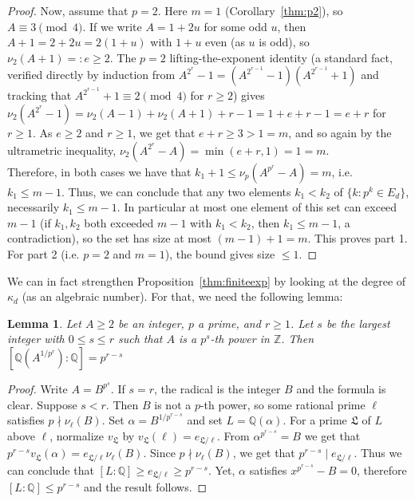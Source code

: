\documentclass{article}
\theoremstyle{plain}
\newtheorem{lemma}[theorem]{Lemma}
\theoremstyle{definition}
\theoremstyle{remark}
\newcommand{\Z}{\mathbb{Z}}
\newcommand{\Q}{\mathbb{Q}}
\begin{document}
\begin{proof}
 Now, assume that $p=2$. Here $m=1$ (Corollary~\ref{thm:p2}), so $A\equiv3\pmod4$. If we write $A=1+2u$ for some odd $u$, then $A+1=2+2u=2(1+u)$ with $1+u$ even (as $u$ is odd), so $\nu_2(A+1)=:e\ge2$. The $p=2$ lifting-the-exponent identity (a standard fact, verified directly by induction from $A^{2^{r}}-1=(A^{2^{r-1}}-1)(A^{2^{r-1}}+1)$ and tracking that $A^{2^{r-1}}+1\equiv2\pmod4$ for $r\ge2$) gives $\nu_2(A^{2^r}-1)=\nu_2(A-1)+\nu_2(A+1)+r-1=1+e+r-1=e+r$ for $r\ge1$. As $e\ge2$ and $r\ge1$, we get that $e+r\ge3>1=m$, and so again by the ultrametric inequality, $\nu_2(A^{2^r}-A)=\min(e+r,1)=1=m$.\\

Therefore, in both cases we have that $k_1+1\le\nu_p(A^{p^r}-A)=m$, i.e.\ $k_1\le m-1$. Thus, we can conclude that any two elements $k_1<k_2$ of $\{k:p^k\in E_d\}$, necessarily $k_1\le m-1$. In particular at most one element of this set can exceed $m-1$ (if $k_1,k_2$ both exceeded $m-1$ with $k_1<k_2$, then $k_1\le m-1$, a contradiction), so the set has size at most $(m-1)+1=m$. This proves part 1. For part 2 (i.e. $p=2$ and $m=1$), the bound gives size $\le1$.
\end{proof}

We can in fact strengthen Proposition~\ref{thm:finiteexp} by looking at the degree of $\kappa_d$ (as an algebraic number). For that, we need the following lemma:


\begin{lemma}\label{lem:radical-degree}
Let $A\ge2$ be an integer, $p$ a prime, and $r\ge1$. Let $s$ be the largest integer with $0\le s\le r$ such that $A$ is a $p^s$-th power in $\Z$. Then $[\Q(A^{1/p^r}):\Q]=p^{r-s}$
\end{lemma}

\begin{proof}
Write $A=B^{p^s}$. If $s=r$, the radical is the integer $B$ and the formula is clear. Suppose $s<r$. Then $B$ is not a $p$-th power, so some rational prime $\ell$ satisfies $p\nmid\nu_\ell(B)$.
Set $\alpha=B^{1/p^{r-s}}$ and set $L=\Q(\alpha)$. For a prime $\mathfrak L$ of $L$ above $\ell$, normalize $v_{\mathfrak L}$ by $v_{\mathfrak L}(\ell)=e_{\mathfrak L/\ell}$. From $\alpha^{p^{r-s}}=B$ we get that $p^{r-s}v_{\mathfrak L}(\alpha)
=e_{\mathfrak L/\ell}\nu_\ell(B)$.
Since $p\nmid\nu_\ell(B)$, we get that  $p^{r-s}\mid e_{\mathfrak L/\ell}$. Thus we can conclude that $[L:\Q]\ge e_{\mathfrak L/\ell}\ge p^{r-s}$. Yet,  $\alpha$ satisfies $x^{p^{r-s}}-B=0$, therefore $[L:\Q]\le p^{r-s}$ and the result follows.
\end{proof}
\end{document}
